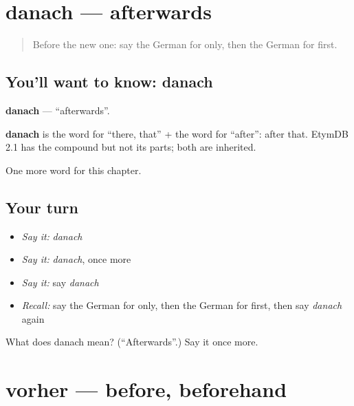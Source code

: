\section[danach]{danach — afterwards}

\label{lesson:GE-C171-danach}



\begin{quote}
Before the new one: say the German for only, then the German for first.
\end{quote}

\subsection*{You'll want to know: danach}
\textbf{danach} — \textquotedblleft{}afterwards\textquotedblright{}.

\begin{cousinweb}
\textbf{danach} is the word for \textquotedblleft{}there, that\textquotedblright{} + the word for \textquotedblleft{}after\textquotedblright{}: after that. EtymDB 2.1 has the compound but not its parts; both are inherited.
\end{cousinweb}

\begin{grammarlens}[title={What you've built}]
One more word for this chapter.
\end{grammarlens}

\subsection*{Your turn}
\begin{itemize}
\raggedright
  \item \emph{Say it:} \emph{danach}
  \item \emph{Say it:} \emph{danach}, once more
  \item \emph{Say it:} say \emph{danach}
  \item \emph{Recall:} say the German for only, then the German for first, then say \emph{danach} again
\end{itemize}

\begin{tcolorbox}[breakable,colback=teal!4,colframe=teal!35!black,title={Before you move on}]
What does danach mean? (\textquotedblleft{}Afterwards\textquotedblright{}.) Say it once more.
\end{tcolorbox}
\section[vorher]{vorher — before, beforehand}

